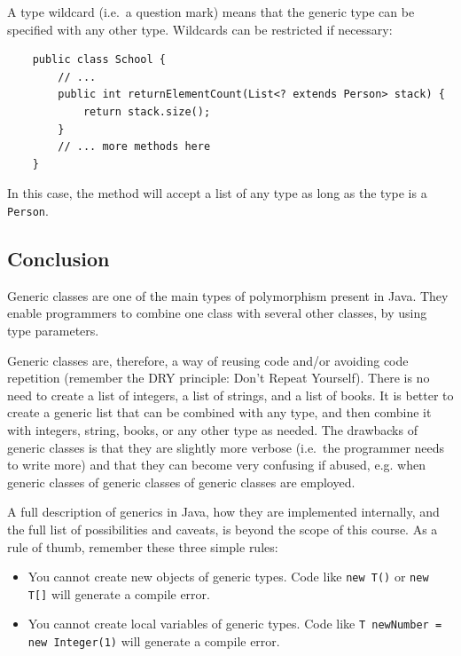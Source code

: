 A type wildcard (i.e.~a question mark) means that the generic
type can be specified with any other type. Wildcards can be restricted
if necessary: 

\begin{verbatim}
    public class School {
        // ...
        public int returnElementCount(List<? extends Person> stack) {
            return stack.size();
        }
        // ... more methods here
    }
\end{verbatim}

In this case, the method will accept a list of any type as long as the
type is a \verb+Person+. 

%
% 
% 


\subsection{Conclusion}
\label{sec:conclusion-2}

Generic classes are one of the main types of polymorphism present in
Java. They enable programmers to combine one class with several other
classes, by using type parameters. 

Generic classes are, therefore, a way of reusing code and/or avoiding
code repetition (remember the DRY principle: Don't Repeat Yourself). 
There is no need to create a list of integers, a list of
strings, and a list of books. It is better to create a generic list
that can be combined with any type, and then combine it with integers,
string, books, or any other type as needed. The drawbacks of generic
classes is that they are slightly more verbose (i.e.~the programmer
needs to write more) and that they can become very confusing if
abused, e.g. when generic classes of generic classes of generic
classes are employed. 

A full description of generics in Java, how they are implemented
internally, and the full list of possibilities and caveats, is beyond
the scope of this course. As a rule of thumb, remember these three
simple rules: 

\begin{itemize}
\item You cannot create new objects of generic types. Code like
  \verb+new T()+ or \verb+new T[]+ will generate a compile error.
\item You cannot create local variables of generic types. Code like
  \verb+T newNumber = new Integer(1)+ will generate a compile error. 
\end{itemize}

